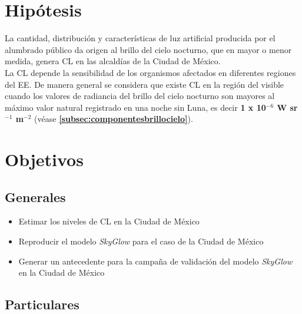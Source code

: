 \section{Hipótesis}

\vspace{5mm}

La cantidad, distribución y características de luz artificial producida por el alumbrado público da origen al brillo del cielo nocturno, que en mayor o menor medida, genera CL en las alcaldías de la Ciudad de México.\\

La CL depende la sensibilidad de los organismos afectados en diferentes regiones del EE. De manera general se considera que existe CL en la región del visible cuando los valores de radiancia del brillo del cielo nocturno son mayores al máximo valor natural registrado en una noche sin Luna, es decir \textbf{1 x 10$^{-6}$ W sr$^{-1}$  m$^{-2}$} (véase \textbf{\autoref{subsec:componentesbrillocielo}}).\\


\section{Objetivos}

\vspace{5mm}

\subsection{Generales}

\vspace{5mm}

\begin{itemize}

	\item Estimar los niveles de CL en la Ciudad de México 

    \item Reproducir el modelo \textit{SkyGlow} para el caso de la Ciudad de México
    
    \item Generar un antecedente para la campaña de validación del modelo \textit{SkyGlow} en la Ciudad de México
    
\end{itemize}

\vspace{5mm}

\subsection{Particulares}

